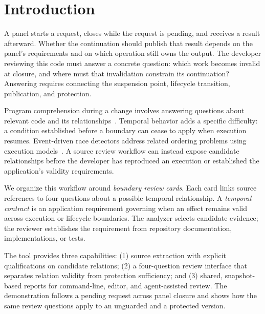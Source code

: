\section{Introduction}
A panel starts a request, closes while the request is pending, and receives a result afterward. Whether the continuation should publish that result depends on the panel's requirements and on which operation still owns the output. The developer reviewing this code must answer a concrete question: which work becomes invalid at closure, and where must that invalidation constrain its continuation? Answering requires connecting the suspension point, lifecycle transition, publication, and protection.

Program comprehension during a change involves answering questions about relevant code and its relationships~\cite{sillito2006}. Temporal behavior adds a specific difficulty: a condition established before a boundary can cease to apply when execution resumes. Event-driven race detectors address related ordering problems using execution models~\cite{raychev2013}. A source review workflow can instead expose candidate relationships before the developer has reproduced an execution or established the application's validity requirements.

We organize this workflow around \emph{boundary review cards}. Each card links source references to four questions about a possible temporal relationship. A \emph{temporal contract} is an application requirement governing when an effect remains valid across execution or lifecycle boundaries. The analyzer selects candidate evidence; the reviewer establishes the requirement from repository documentation, implementations, or tests.

The tool provides three capabilities: (1) source extraction with explicit qualifications on candidate relations; (2) a four-question review interface that separates relation validity from protection sufficiency; and (3) shared, snapshot-based reports for command-line, editor, and agent-assisted review. The demonstration follows a pending request across panel closure and shows how the same review questions apply to an unguarded and a protected version.
